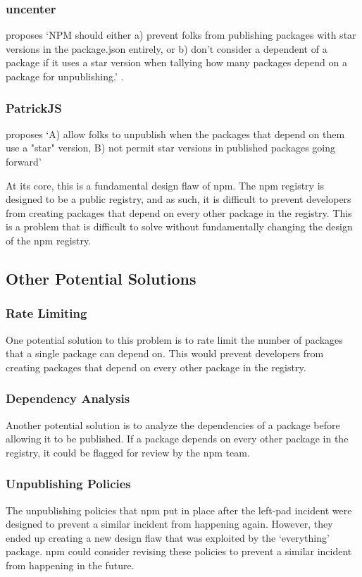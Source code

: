 \documentclass[acmsmall]{acmart}
\begin{document}
\subsubsection{uncenter} proposes `NPM should either a) prevent folks from
publishing packages with star versions in the package.json entirely, or b) don't
consider a dependent of a package if it uses a star version when tallying how
many packages depend on a package for unpublishing.' \cite{uncenter-blog-everything}.

\subsubsection{PatrickJS} proposes `A) allow folks to unpublish when the
packages that depend on them use a "star" version, B) not permit star versions
in published packages going forward' \cite{bleepingcomputer-everything}

At its core, this is a fundamental design flaw of npm. The npm registry is
designed to be a public registry, and as such, it is difficult to prevent
developers from creating packages that depend on every other package in the
registry. This is a problem that is difficult to solve without fundamentally
changing the design of the npm registry.

\subsection{Other Potential Solutions}
\subsubsection{Rate Limiting}
One potential solution to this problem is to rate limit the number of packages
that a single package can depend on. This would prevent developers from creating
packages that depend on every other package in the registry.

\subsubsection{Dependency Analysis}
Another potential solution is to analyze the dependencies of a package before
allowing it to be published. If a package depends on every other package in the
registry, it could be flagged for review by the npm team.

\subsubsection{Unpublishing Policies}
The unpublishing policies that npm put in place after the left-pad incident
were designed to prevent a similar incident from happening again. However, they
ended up creating a new design flaw that was exploited by the `everything'
package. npm could consider revising these policies to prevent a similar
incident from happening in the future.
\end{document}
